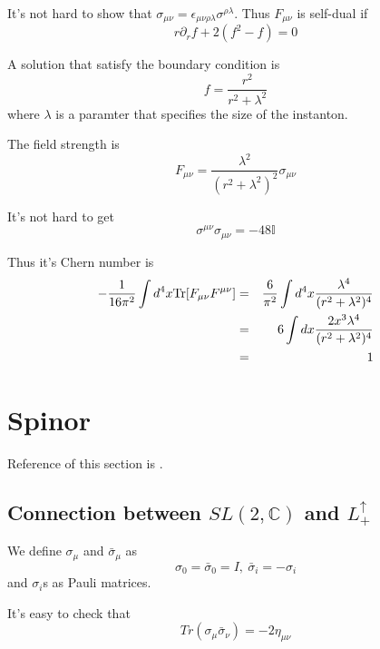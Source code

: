 \documentclass[12pt]{book}
\begin{document}
		It's not hard to show that $\sigma_{\mu\nu}=\epsilon_{\mu\nu\rho\lambda}\sigma^{\rho\lambda}$. Thus $F_{\mu\nu}$ is self-dual if
		\begin{equation}
			r\partial_rf+2(f^2-f)=0
		\end{equation}
		
		A solution that satisfy the boundary condition is
		\begin{equation}
			f=\frac{r^2}{r^2+\lambda^2}
		\end{equation}
		where $\lambda$ is a paramter that specifies the size of the instanton.
		
		The field strength is
		\begin{equation}
			F_{\mu\nu}=\frac{\lambda^2}{(r^2+\lambda^2)^2}\sigma_{\mu\nu}
		\end{equation}
		
		It's not hard to get
		\begin{equation}
			\sigma^{\mu\nu}\sigma_{\mu\nu}=-48\mathbb I
		\end{equation}
		
		Thus it's Chern number is
		\begin{eqnarray}
			-\frac 1{16\pi^2}\int d^4x{\rm Tr}[F_{\mu\nu}F^{\mu\nu}]&=&\frac 6{\pi^2}\int d^4x\frac{\lambda^4}{(r^2+\lambda^2)^4}\\
			&=&6\int dx\frac{2x^3\lambda^4}{(r^2+\lambda^2)^4}\\
			&=&1
		\end{eqnarray}	
	
	\section{Spinor}
	
	Reference of this section is \cite{susy_book}.
	\subsection{Connection between $SL(2,\mathbb C)$ and $L_+^\uparrow$}
	
	We define $\sigma_\mu$ and $\bar\sigma_\mu$ as
	\begin{equation}
		\sigma_0=\bar \sigma_0=I,\ \bar\sigma_i=-\sigma_i
	\end{equation}
	and $\sigma_i$s as Pauli matrices.
	
	It's easy to check that
	\begin{equation}
		Tr(\sigma_\mu\bar\sigma_\nu)=-2\eta_{\mu\nu} \label{eqn:spinor_tool}
	\end{equation}
	
\end{document}
